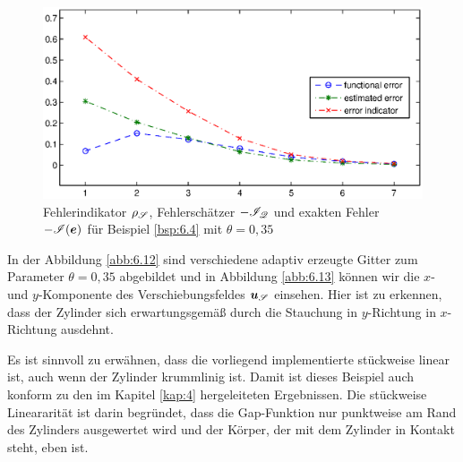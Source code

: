 \begin{bsp}
    

\begin{figure}[ht]
\begin{center}
\includegraphics[width=12cm]{Abbildungen/example_4_0,35_depth_6/diagramm.eps}
\end{center}
\caption[Diagramm mit dem Fehler für Beispiel \ref{bsp:6.4}]{Fehlerindikator $\rho_{\mathscr S}$, Fehlerschätzer $-\mathscr I_{\mathscr Q}$ und exakten Fehler $-\mathscr I(\boldsymbol e)$ für Beispiel \ref{bsp:6.4} mit $\theta=0,35$\label{abb:6.11}}
\end{figure}

In der Abbildung \ref{abb:6.12} sind verschiedene adaptiv erzeugte Gitter zum Parameter $\theta = 0,35$ abgebildet und in Abbildung \ref{abb:6.13} können wir die $x$- und $y$-Komponente des Verschiebungsfeldes $\boldsymbol u_{\mathscr S}$ einsehen. Hier ist zu erkennen, dass der Zylinder sich erwartungsgemäß durch die Stauchung in $y$-Richtung in $x$-Richtung ausdehnt.

Es ist sinnvoll zu erwähnen, dass die vorliegend implementierte  stückweise linear ist, auch wenn der Zylinder krummlinig ist. Damit ist dieses Beispiel auch konform zu den im Kapitel \ref{kap:4} hergeleiteten Ergebnissen. Die stückweise Lineararität ist darin begründet, dass die Gap-Funktion nur punktweise am Rand des Zylinders ausgewertet wird und der Körper, der mit dem Zylinder in Kontakt steht, eben ist.


\end{bsp}

